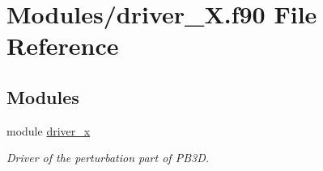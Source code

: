\hypertarget{driver__X_8f90}{}\section{Modules/driver\+\_\+X.f90 File Reference}
\label{driver__X_8f90}
\subsection*{Modules}
\begin{DoxyCompactItemize}
\item 
module \hyperlink{namespacedriver__x}{driver\+\_\+x}
\begin{DoxyCompactList}\small\item\em Driver of the perturbation part of P\+B3D. \end{DoxyCompactList}\end{DoxyCompactItemize}
